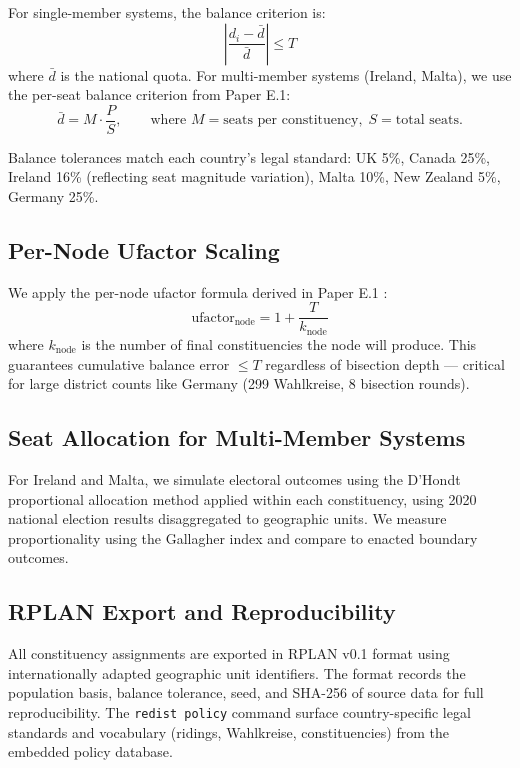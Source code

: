 For single-member systems, the balance criterion is:
\begin{equation}
    \left| \frac{d_i - \bar{d}}{\bar{d}} \right| \leq T
\end{equation}
where $\bar{d}$ is the national quota. For multi-member systems (Ireland, Malta), we use the per-seat balance criterion from Paper E.1:
\begin{equation}
    \bar{d} = M \cdot \frac{P}{S}, \qquad \text{where } M = \text{seats per constituency}, \; S = \text{total seats}.
\end{equation}

Balance tolerances match each country's legal standard: UK 5\%, Canada 25\%, Ireland 16\% (reflecting seat magnitude variation), Malta 10\%, New Zealand 5\%, Germany 25\%.

\subsection{Per-Node Ufactor Scaling}

We apply the per-node ufactor formula derived in Paper E.1 \citep{dellib2026mmdistricts}:
\begin{equation}
    \text{ufactor}_{\text{node}} = 1 + \frac{T}{k_{\text{node}}}
\end{equation}
where $k_{\text{node}}$ is the number of final constituencies the node will produce. This guarantees cumulative balance error $\leq T$ regardless of bisection depth --- critical for large district counts like Germany (299 Wahlkreise, 8 bisection rounds).

\subsection{Seat Allocation for Multi-Member Systems}

For Ireland and Malta, we simulate electoral outcomes using the D'Hondt proportional allocation method \citep{dhondt1882} applied within each constituency, using 2020 national election results disaggregated to geographic units. We measure proportionality using the Gallagher index and compare to enacted boundary outcomes.


\subsection{RPLAN Export and Reproducibility}

All constituency assignments are exported in RPLAN v0.1 format \citep{redistcli2026} using internationally adapted geographic unit identifiers. The format records the population basis, balance tolerance, seed, and SHA-256 of source data for full reproducibility. The \texttt{redist policy} command surface country-specific legal standards and vocabulary (ridings, Wahlkreise, constituencies) from the embedded policy database.
